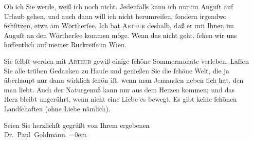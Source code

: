 \pstart
           Ob ich Sie \label{K_L03527-4v}\label{K_L03527-4} werde, weiß ich noch nicht. Jedenfalls kann ich nur im Auguſt auf Urlaub gehen, {\pb}und auch dann
               will ich nicht herumreiſen, ſondern irgendwo feſtſitzen, etwa am Wörtherſee. Ich bat \textsc{Arthur}{ } deshalb, daß er mit Ihnen im Auguſt an den Wörtherſee
               kommen möge. Wenn das nicht geht, ſehen wir uns hoffentlich auf meiner Rückreiſe in
                  Wien.\pend
           
\pstart
           Sie ſelbſt werden mit \textsc{Arthur} gewiß einige ſchöne {\pb}Sommermonate verleben.
               Laſſen Sie alle trüben Gedanken zu Hauſe und genießen Sie die ſchöne Welt, die ja
               überhaupt nur dann wirklich ſchön iſt, wenn man Jemanden neben ſich hat, den man  liebt. Auch der Naturgenuß kann nur aus dem Herzen
               kommen; und das Herz bleibt ungerührt, wenn nicht eine Liebe es bewegt. Es gibt keine
               ſchönen Landſchaften (ohne Liebe nämlich).\pend
           
\pstart
           Seien Sie herzlichſt gegrüßt von Ihrem ergebenen {\\[\baselineskip]}\spacefill\mbox{Dr. Paul Goldmann.}\pend
           \leftskip=0em{}\endnumbering{}  
      